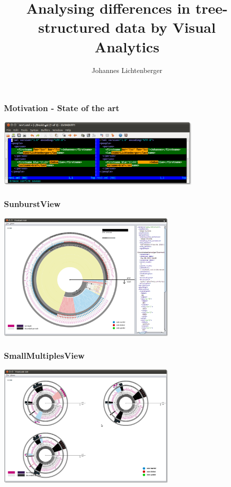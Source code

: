 \documentclass{beamer}
\title{Analysing differences in tree-structured data by Visual Analytics}
\author{Johannes Lichtenberger}\institute{Distributed Systems Group}
\begin{document}
\begin{frame}
\titlepage
\end{frame}

\begin{frame}
\frametitle{Motivation - State of the art}
\begin{center}
\includegraphics[width=4.0in]{images/gvimdiff.png}
\end{center}
\end{frame}

\begin{frame}
\frametitle{SunburstView}
\begin{center}
\includegraphics[width=3.5in]{images/treetank-gui.png}
\end{center}
\end{frame}

\begin{frame}
\frametitle{SmallMultiplesView}
\begin{center}
\includegraphics[width=3.5in]{images/treetank-gui-smallmultiples.png}
\end{center}
\end{frame}
\end{document}
